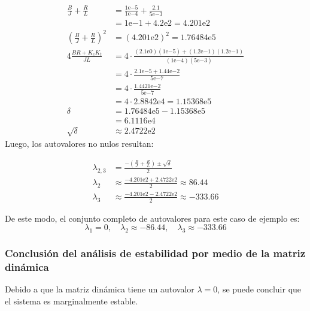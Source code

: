 \begin{equation*}
\begin{aligned}
\tfrac{B}{J} + \tfrac{R}{L} &= \tfrac{1\mathrm{e}{-5}}{1\mathrm{e}{-4}} + \tfrac{2.1}{5\mathrm{e}{-3}} \\
&= 1\mathrm{e}{-1} + 4.2\mathrm{e}{2} = 4.201\mathrm{e}{2} \\[2pt]
\left(\tfrac{B}{J} + \tfrac{R}{L}\right)^2 &= (4.201\mathrm{e}{2})^{2} = 1.76484\mathrm{e}{5} \\[2pt]
4 \tfrac{BR+K_e K_t}{JL} &= 4 \cdot \tfrac{(2.1\mathrm{e}{0})(1\mathrm{e}{-5}) + (1.2\mathrm{e}{-1})(1.2\mathrm{e}{-1})}{(1\mathrm{e}{-4})(5\mathrm{e}{-3})} \\
&= 4 \cdot \tfrac{2.1\mathrm{e}{-5} + 1.44\mathrm{e}{-2}}{5\mathrm{e}{-7}} \\
&= 4 \cdot \tfrac{1.4421\mathrm{e}{-2}}{5\mathrm{e}{-7}} \\
&= 4 \cdot 2.8842\mathrm{e}{4} = 1.15368\mathrm{e}{5} \\[2pt]
\delta &= 1.76484\mathrm{e}{5} - 1.15368\mathrm{e}{5}\\
       &= 6.1116\mathrm{e}{4} \\[2pt]
\sqrt{\delta} &\approx 2.4722\mathrm{e}{2}
\end{aligned}
\end{equation*}
Luego, los autovalores no nulos resultan:

\begin{equation*}
\begin{aligned}
\lambda_{2,3} &= \frac{ - \left( \tfrac{B}{J} + \tfrac{R}{L} \right) \pm \sqrt{\delta}}{2} \\[2pt]
\lambda_2 &\approx \frac{-4.201\mathrm{e}{2} + 2.4722\mathrm{e}{2}}{2} \approx  86.44 \\[2pt]
\lambda_3 &\approx \frac{-4.201\mathrm{e}{2} - 2.4722\mathrm{e}{2}}{2} \approx -333.66
\end{aligned}
\end{equation*}

De este modo, el conjunto completo de autovalores para este caso de ejemplo es:
\begin{equation}
    \lambda_1 = 0,\quad \lambda_2 \approx -86.44,\quad \lambda_3 \approx -333.66
    \label{eq:ResultadoAutovaloresExperimental}
\end{equation}

\subsubsection{Conclusión del análisis de estabilidad por medio de la matriz dinámica}

Debido a que la matriz dinámica tiene un autovalor $\lambda={0}$, se puede
concluir que el sistema es marginalmente estable.
